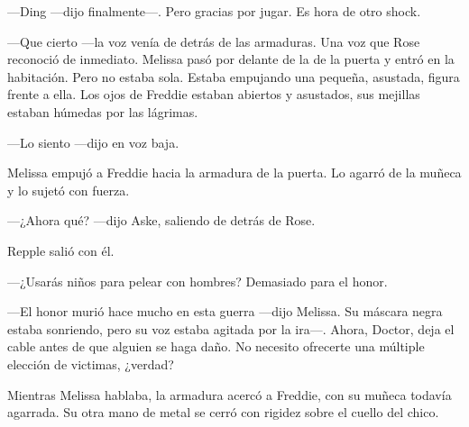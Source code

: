 {---Ding ---dijo finalmente---. Pero gracias por jugar. Es hora de otro
shock.}

{---Que cierto ---la voz venía de detrás de las armaduras. Una voz que
	Rose reconoció de inmediato. Melissa pasó por delante de la de la puerta
	y entró en la habitación. Pero no estaba sola. Estaba empujando una
	pequeña, asustada, figura frente a ella. Los ojos de Freddie estaban
abiertos y asustados, sus mejillas estaban húmedas por las lágrimas.}

{---Lo siento ---dijo en voz baja.}

{Melissa empujó a Freddie hacia la armadura de la puerta. Lo agarró de
la muñeca y lo sujetó con fuerza.}

{---¿Ahora qué? ---dijo Aske, saliendo de detrás de Rose. }

{Repple salió con él. }

{---¿Usarás niños para pelear con hombres? Demasiado para el honor.}

{---El honor murió hace mucho en esta guerra ---dijo Melissa. Su máscara
	negra estaba sonriendo, pero su voz estaba agitada por la ira---. Ahora,
	Doctor, deja el cable antes de que alguien se haga daño. No necesito
ofrecerte una múltiple elección de victimas, ¿verdad?}

{Mientras Melissa hablaba, la armadura acercó a Freddie, con su muñeca
	todavía agarrada. Su otra mano de metal se cerró con rigidez sobre el
cuello del chico.}
